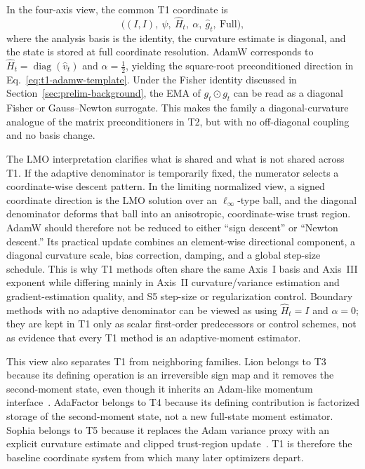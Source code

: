 In the four-axis view, the common T1 coordinate is
\begin{equation}
  \big((I,I),\ \psi,\ \hat{H}_t,\ \alpha,\ \widehat{g}_t,\ \mathrm{Full}\big),
\end{equation}
where the analysis basis is the identity, the curvature estimate is diagonal,
and the state is stored at full coordinate resolution.  AdamW corresponds to
$\hat{H}_t=\operatorname{diag}(\hat{v}_t)$ and
$\alpha=\tfrac{1}{2}$, yielding the square-root preconditioned direction in
Eq.~\eqref{eq:t1-adamw-template}.  Under the Fisher identity discussed in
Section~\ref{sec:prelim-background}, the EMA of $g_t \odot g_t$ can be read as
a diagonal Fisher or Gauss--Newton surrogate.  This makes the family a
diagonal-curvature analogue of the matrix preconditioners in T2, but with no
off-diagonal coupling and no basis change.

The LMO interpretation clarifies what is shared and what is not shared across
T1.  If the adaptive denominator is temporarily fixed, the numerator selects a
coordinate-wise descent pattern.  In the limiting normalized view, a signed
coordinate direction is the LMO solution over an $\ell_\infty$-type ball, and
the diagonal denominator deforms that ball into an anisotropic, coordinate-wise
trust region.  AdamW should therefore not be reduced to either ``sign descent''
or ``Newton descent.''  Its practical update combines an element-wise
directional component, a diagonal curvature scale, bias correction, damping,
and a global step-size schedule.  This is why T1 methods often share the same
Axis~I basis and Axis~III exponent while differing mainly in Axis~II
curvature/variance estimation and gradient-estimation quality, and S5
step-size or regularization control.  Boundary methods with no adaptive
denominator can be viewed as using $\hat{H}_t=I$ and $\alpha=0$; they are
kept in T1 only as scalar first-order predecessors or control schemes, not as
evidence that every T1 method is an adaptive-moment estimator.

This view also separates T1 from neighboring families.  Lion belongs to T3
because its defining operation is an irreversible sign map and it removes the
second-moment state, even though it inherits an Adam-like momentum
interface~\citep{chen2023symbolic}.  AdaFactor belongs to T4 because its
defining contribution is factorized storage of the second-moment state, not a
new full-state moment estimator.  Sophia belongs to T5 because it replaces the
Adam variance proxy with an explicit curvature estimate and clipped
trust-region update~\citep{liu2023sophia}.  T1 is therefore the baseline
coordinate system from which many later optimizers depart.

